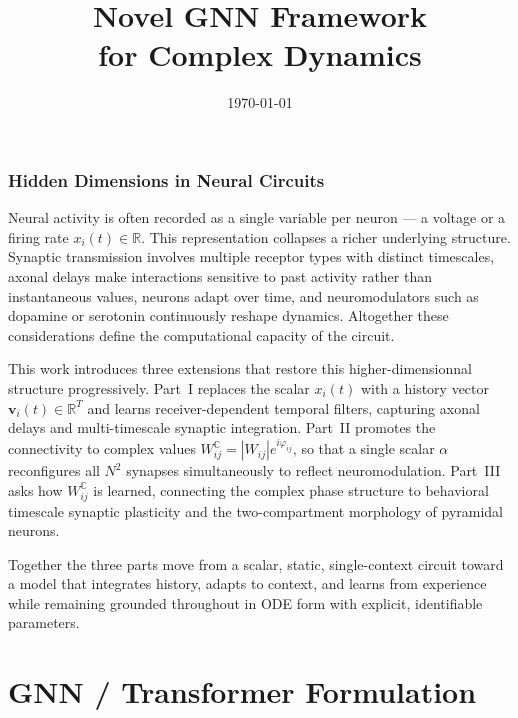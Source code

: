 \documentclass[11pt]{article}
\title{\textbf{Novel GNN Framework\\for Complex Dynamics}}
\date{\today}
\begin{document}
\maketitle
\section{Hidden Dimensions in Neural Circuits}

Neural activity is often recorded as a single variable per neuron
--- a voltage or a firing rate $x_i(t) \in \mathbb{R}$. This
representation collapses a richer underlying structure. Synaptic
transmission involves multiple receptor types with distinct
timescales, axonal delays make interactions sensitive to past
activity rather than instantaneous values, neurons adapt over time,
and neuromodulators such as dopamine or serotonin continuously
reshape dynamics. Altogether these considerations define
the computational capacity of the circuit.

This work introduces three extensions that restore this higher-dimensionnal structure
progressively. Part~I replaces the scalar $x_i(t)$ with a history
vector $\mathbf{v}_i(t) \in \mathbb{R}^T$ and learns
receiver-dependent temporal filters, capturing axonal delays and
multi-timescale synaptic integration. Part~II promotes the
connectivity to complex values $W_{ij}^{\mathbb{C}} =
|W_{ij}|e^{i\varphi_{ij}}$, so that a single scalar $\alpha$
reconfigures all $N^2$ synapses simultaneously to reflect neuromodulation.
Part~III asks how $W_{ij}^{\mathbb{C}}$ is learned, connecting the
complex phase structure to behavioral timescale synaptic plasticity
and the two-compartment morphology of pyramidal neurons.

Together the three parts move from a scalar, static, single-context
circuit toward a model that integrates history, adapts to context,
and learns from experience while remaining grounded throughout
in ODE form with explicit, identifiable parameters.

\newpage
\part{GNN / Transformer Formulation}
\end{document}
